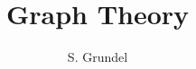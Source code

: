 \documentclass[colorlinks]{article}
\begin{document}
%
\title{Graph Theory}
\author{S. Grundel}
\maketitle


%
\end{document}
